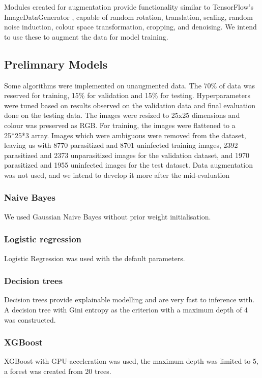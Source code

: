 \documentclass[10pt,twocolumn,letterpaper]{article}
\begin{document}
Modules created for augmentation provide functionality similar to TensorFlow's ImageDataGenerator \cite{tensorflow_imagedatagen}, capable of random rotation, translation, scaling, random noise induction, colour space transformation, cropping, and denoising. We intend to use these to augment the data for model training.

\subsection{Prelimnary Models}

Some algorithms were implemented on unaugmented data. The 70\% of data was reserved for training, 15\% for validation and 15\% for testing. Hyperparameters were tuned based on results observed on the validation data and final evaluation done on the testing data. The images were resized to 25x25 dimensions and colour was preserved as RGB. For training, the images were flattened to a 25*25*3 array. Images which were ambiguous \cite{fuhadmalaria} were removed from the dataset, leaving us with 8770 parasitized and 8701 uninfected training images, 2392 parasitized and 2373 unparasitized images for the validation dataset, and 1970 parasitized and 1955 uninfected images for the test dataset. Data augmentation was not used, and we intend to develop it more after the mid-evaluation

\subsubsection{Naive Bayes}
We used Gaussian Naive Bayes without prior weight initialisation.

\subsubsection{Logistic regression}
Logistic Regression was used with the default parameters.

\subsubsection{Decision trees}
Decision trees provide explainable modelling and are very fast to inference with. A decision tree with Gini entropy as the criterion with a maximum depth of 4 was constructed.

\subsubsection{XGBoost}
XGBoost with GPU-acceleration was used, the maximum depth was limited to 5, a forest was created from 20 trees.
\end{document}
